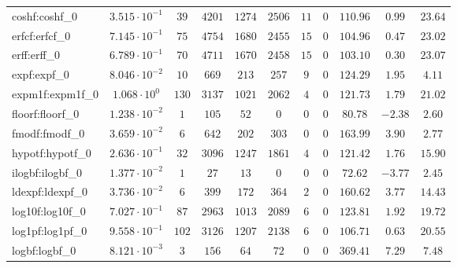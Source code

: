 \begin{tabular}{|l|c|c|c|c|c|c|c|c|c|c|}
coshf:coshf\_0               & $ 3.515 \cdot 10^{-1} $ & $ 39     $ & $ 4201  $ & $ 1274  $ & $ 2506  $ & $ 11  $ & $ 0 $ & $ 110.96      $ & $ 0.99    $ & $ 23.64   $ \\
erfcf:erfcf\_0               & $ 7.145 \cdot 10^{-1} $ & $ 75     $ & $ 4754  $ & $ 1680  $ & $ 2455  $ & $ 15  $ & $ 0 $ & $ 104.96      $ & $ 0.47    $ & $ 23.02   $ \\
erff:erff\_0                 & $ 6.789 \cdot 10^{-1} $ & $ 70     $ & $ 4711  $ & $ 1670  $ & $ 2458  $ & $ 15  $ & $ 0 $ & $ 103.10      $ & $ 0.30    $ & $ 23.07   $ \\
expf:expf\_0                 & $ 8.046 \cdot 10^{-2} $ & $ 10     $ & $ 669   $ & $ 213   $ & $ 257   $ & $ 9   $ & $ 0 $ & $ 124.29      $ & $ 1.95    $ & $ 4.11    $ \\
expm1f:expm1f\_0             & $ 1.068 \cdot 10^{0}  $ & $ 130    $ & $ 3137  $ & $ 1021  $ & $ 2062  $ & $ 4   $ & $ 0 $ & $ 121.73      $ & $ 1.79    $ & $ 21.02   $ \\
floorf:floorf\_0             & $ 1.238 \cdot 10^{-2} $ & $ 1      $ & $ 105   $ & $ 52    $ & $ 0     $ & $ 0   $ & $ 0 $ & $ 80.78       $ & $ -2.38   $ & $ 2.60    $ \\
fmodf:fmodf\_0               & $ 3.659 \cdot 10^{-2} $ & $ 6      $ & $ 642   $ & $ 202   $ & $ 303   $ & $ 0   $ & $ 0 $ & $ 163.99      $ & $ 3.90    $ & $ 2.77    $ \\
hypotf:hypotf\_0             & $ 2.636 \cdot 10^{-1} $ & $ 32     $ & $ 3096  $ & $ 1247  $ & $ 1861  $ & $ 4   $ & $ 0 $ & $ 121.42      $ & $ 1.76    $ & $ 15.90   $ \\
ilogbf:ilogbf\_0             & $ 1.377 \cdot 10^{-2} $ & $ 1      $ & $ 27    $ & $ 13    $ & $ 0     $ & $ 0   $ & $ 0 $ & $ 72.62       $ & $ -3.77   $ & $ 2.45    $ \\
ldexpf:ldexpf\_0             & $ 3.736 \cdot 10^{-2} $ & $ 6      $ & $ 399   $ & $ 172   $ & $ 364   $ & $ 2   $ & $ 0 $ & $ 160.62      $ & $ 3.77    $ & $ 14.43   $ \\
log10f:log10f\_0             & $ 7.027 \cdot 10^{-1} $ & $ 87     $ & $ 2963  $ & $ 1013  $ & $ 2089  $ & $ 6   $ & $ 0 $ & $ 123.81      $ & $ 1.92    $ & $ 19.72   $ \\
log1pf:log1pf\_0             & $ 9.558 \cdot 10^{-1} $ & $ 102    $ & $ 3126  $ & $ 1207  $ & $ 2138  $ & $ 6   $ & $ 0 $ & $ 106.71      $ & $ 0.63    $ & $ 20.55   $ \\
logbf:logbf\_0               & $ 8.121 \cdot 10^{-3} $ & $ 3      $ & $ 156   $ & $ 64    $ & $ 72    $ & $ 0   $ & $ 0 $ & $ 369.41      $ & $ 7.29    $ & $ 7.48    $ \\

\end{tabular}
